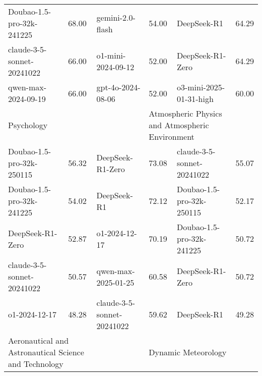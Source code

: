 {\begin{longtable}{p{4.2cm}>{\centering\arraybackslash} p{0.8cm}|p{4.2cm} >{\centering\arraybackslash} p{0.8cm}|p{4.2cm} >{\centering\arraybackslash} p{0.8cm}}
\cellcolor{cyan!5} Doubao-1.5-pro-32k-241225 & \cellcolor{cyan!2}68.00 & \cellcolor{blue!5} gemini-2.0-flash & \cellcolor{blue!2} 54.00 & \cellcolor{green!5} DeepSeek-R1 & \cellcolor{green!2} 64.29\\
\cellcolor{cyan!5} claude-3-5-sonnet-20241022 & \cellcolor{cyan!2}66.00 & \cellcolor{blue!5} o1-mini-2024-09-12 & \cellcolor{blue!2} 52.00 & \cellcolor{green!5} DeepSeek-R1-Zero & \cellcolor{green!2} 64.29\\
\cellcolor{cyan!5} qwen-max-2024-09-19 & \cellcolor{cyan!2}66.00 & \cellcolor{blue!5} gpt-4o-2024-08-06 & \cellcolor{blue!2} 52.00 & \cellcolor{green!5} o3-mini-2025-01-31-high & \cellcolor{green!2} 60.00\\
\hline
\multicolumn{2}{p{5.15cm}|}{\cellcolor{cyan!10} \centering Psychology} & \multicolumn{2}{p{5.15cm}|}{\cellcolor{brown!10} \centering Archaeology and Museology} & \multicolumn{2}{p{5.15cm}}{\cellcolor{green!10} \centering Atmospheric Physics and Atmospheric Environment}\\
\hline
\cellcolor{cyan!5} Doubao-1.5-pro-32k-250115 & \cellcolor{cyan!2}56.32 & \cellcolor{brown!5} DeepSeek-R1-Zero & \cellcolor{brown!2} 73.08 & \cellcolor{green!5} claude-3-5-sonnet-20241022 & \cellcolor{green!2} 55.07\\
\cellcolor{cyan!5} Doubao-1.5-pro-32k-241225 & \cellcolor{cyan!2}54.02 & \cellcolor{brown!5} DeepSeek-R1 & \cellcolor{brown!2} 72.12 & \cellcolor{green!5} Doubao-1.5-pro-32k-250115 & \cellcolor{green!2} 52.17\\
\cellcolor{cyan!5} DeepSeek-R1-Zero & \cellcolor{cyan!2}52.87 & \cellcolor{brown!5} o1-2024-12-17 & \cellcolor{brown!2} 70.19 & \cellcolor{green!5} Doubao-1.5-pro-32k-241225 & \cellcolor{green!2} 50.72\\
\cellcolor{cyan!5} claude-3-5-sonnet-20241022 & \cellcolor{cyan!2}50.57 & \cellcolor{brown!5} qwen-max-2025-01-25 & \cellcolor{brown!2} 60.58 & \cellcolor{green!5} DeepSeek-R1-Zero & \cellcolor{green!2} 50.72\\
\cellcolor{cyan!5} o1-2024-12-17 & \cellcolor{cyan!2}48.28 & \cellcolor{brown!5} claude-3-5-sonnet-20241022 & \cellcolor{brown!2} 59.62 & \cellcolor{green!5} DeepSeek-R1 & \cellcolor{green!2} 49.28\\
\hline
\multicolumn{2}{p{5.15cm}|}{\cellcolor{blue!10} \centering Aeronautical and Astronautical Science and Technology} & \multicolumn{2}{p{5.15cm}|}{\cellcolor{brown!10} \centering Historical Geography} & \multicolumn{2}{p{5.15cm}}{\cellcolor{green!10} \centering Dynamic Meteorology}\\

\end{longtable}}
